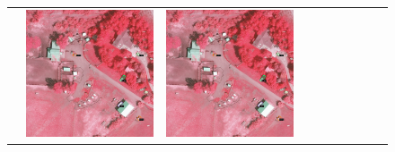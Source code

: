 \begin{figure}[H]
\begin{tabularx}{\textwidth}{c|*{9}{X}}
    & \includegraphics[trim={730pt 220pt 200pt 720pt},clip,width=\linewidth]{images/015Results/02perm_exp/comp_images/irgb/523.png}
    & \includegraphics[trim={850pt 110pt 80pt 830pt},clip,width=\linewidth]{images/015Results/02perm_exp/comp_images/irgb/523.png}

\end{tabularx}
\end{figure}
